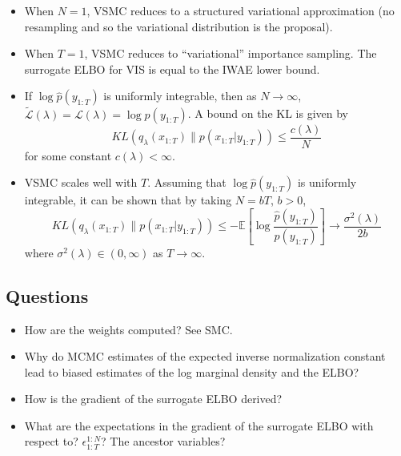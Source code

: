 \documentclass{article}
\begin{document}
\begin{itemize}

\item
When $N=1$, VSMC reduces to a structured variational approximation (no resampling and so the variational distribution is the proposal).

\item
When $T=1$, VSMC reduces to ``variational'' importance sampling. The surrogate ELBO for VIS is equal to the IWAE lower bound.

\item
If $\log \hat{p}(y_{1:T})$ is uniformly integrable, then as $N\rightarrow\infty$, $\tilde{\mathcal{L}}(\lambda)=\mathcal{L}(\lambda)=\log p(y_{1:T})$. A bound on the KL is given by
\[
KL\left(q_\lambda(x_{1:T})\|p(x_{1:T}|y_{1:T})\right)\leq \frac{c(\lambda)}{N}
\]
for some constant $c(\lambda)<\infty$.

\item
VSMC scales well with $T$. Assuming that $\log\hat{p}(y_{1:T})$ is uniformly integrable, it can be shown that by taking $N=bT$, $b>0$,
\[
KL\left(q_\lambda(x_{1:T})\|p(x_{1:T}|y_{1:T})\right)\leq-\mathbb{E}\left[\log\frac{\hat{p}(y_{1:T})}{p(y_{1:T})}\right]\rightarrow \frac{\sigma^2(\lambda)}{2b}
\]
where $\sigma^2(\lambda)\in(0,\infty)$ as $T\rightarrow\infty$.

\end{itemize}


\subsection{Questions}

\begin{itemize}

\item
How are the weights computed? See SMC.

\item
Why do MCMC estimates of the expected inverse normalization constant lead to biased estimates of the log marginal density and the ELBO?

\item
How is the gradient of the surrogate ELBO derived?

\item
What are the expectations in the gradient of the surrogate ELBO with respect to? $\epsilon_{1:T}^{1:N}$? The ancestor variables?

\end{itemize}



\newpage

\printbibliography
\end{document}
